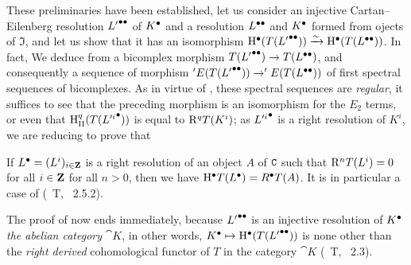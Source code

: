 \begin{env}[11.5.2.3]
\label{0.11.5.2.3}
These preliminaries have been established, let us consider an injective Cartan--Eilenberg resolution ${L'}^{\bullet\bullet}$ of ${K}^{\bullet}$ and a resolution ${L}^{\bullet\bullet}$ and ${K}^{\bullet}$ formed from ojects of $\mathfrak{I}$, 
and let us show that it has an isomorphism ${\mathrm{H}}^{\bullet}(T({L'}^{\bullet\bullet}))\xrightarrow{\sim} {\mathrm{H}}^{\bullet}(T({L}^{\bullet\bullet}))$. In fact, We deduce from  a bicomplex morphism $T({L'}^{\bullet\bullet})\rightarrow T({L}^{\bullet\bullet})$, 
and consequently a sequence of morphism $'E(T({L'}^{\bullet\bullet}))\rightarrow 'E(T({L}^{\bullet\bullet}))$ of first spectral sequences of bicomplexes.
As in virtue of , these spectral sequences are \emph{regular}, it suffices  to see that the preceding morphism is an isomorphism for the $E_2$ terms, 
or even that $\mathrm{H}_\text{II}^q(T({L'^i}^{\bullet}))$ is equal to $\mathrm{R}^q T(K^i)$; as ${L'^i}^{\bullet}$ is a right resolution of $K^i$, we are reducing to prove that
\end{env}
  
\begin{lemma}[11.5.2.4]
\label{0.11.5.2.4}
If ${L}^{\bullet} = (L^i)_{i\in \mathbf{Z}}$ is a right resolution of an object $A$ of $\mathtt{C}$ such that $\mathrm{R}^n T(L^i) = 0$ for all $i\in \mathbf{Z}$ for all $n>0$, then we have ${\mathrm{H}}^{\bullet}T({L}^{\bullet}) = {R}^{\bullet} T(A)$.
It is in particular a case of (~T, ~2.5.2).
\end{lemma}

\begin{env}[11.5.2.5]
\label{0.11.5.2.5}
The proof of  now ends immediately, because ${L'}^{\bullet\bullet}$ is an injective resolution of ${K}^{\bullet}$ \emph{the abelian category} $\cat{K}$,
in other words, $\cx{K} \mapsto \cx{\HH}(T(\bcx{L'}))$ is none other than the \emph{right derived} cohomological functor of $T$ in the category $\cat{K}$ (~T, ~2.3).
\end{env}

